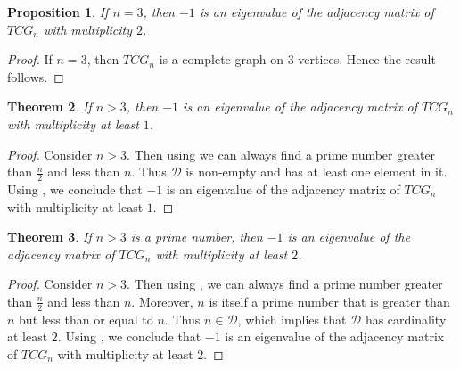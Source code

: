 \documentclass[12pt]{article}
\newtheorem{theorem}{Theorem}[section]
\newtheorem{proposition}[theorem]{Proposition}
\begin{document}
	
	\begin{proposition}
		If $n=3$, then $-1$ is an eigenvalue of the adjacency matrix of $TCG_n$ with multiplicity $2$.
	\end{proposition}
	
	\begin{proof}
		If $n=3$, then $TCG_n$ is a complete graph on $3$ vertices. Hence the result follows.
	\end{proof}
	
	\begin{theorem}
		\label{number1}
		If $n>3$, then $-1$ is an eigenvalue of the adjacency matrix of $TCG_n$ with multiplicity at least $1$.
	\end{theorem}
	
	\begin{proof}
		Consider $n>3$. Then using  we can always find a prime number greater than $\frac{n}{2}$ and less than $n$. Thus $\mathcal{D}$ is non-empty and has at least one element in it. Using , we conclude that $-1$ is an eigenvalue of the adjacency matrix of $TCG_n$ with multiplicity at least $1$.
	\end{proof}
	
	\begin{theorem}
		\label{number2}
		If $n>3$ is a prime number, then $-1$ is an eigenvalue of the adjacency matrix of $TCG_n$ with multiplicity at least $2$.
	\end{theorem}
	
	\begin{proof}
		Consider $n>3$. Then using , we can always find a prime number greater than $\frac{n}{2}$ and less than $n$. Moreover, $n$ is itself a prime number that is greater than $n$ but less than or equal to $n$. Thus $n\in \mathcal{D}$, which implies that  $\mathcal{D}$ has cardinality at least $2$. Using , we conclude that $-1$ is an eigenvalue of the adjacency matrix of $TCG_n$ with multiplicity at least $2$.
	\end{proof}
	
\end{document}
